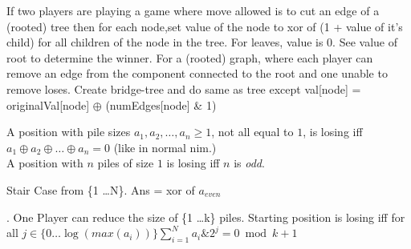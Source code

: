 If two players are playing a game where move allowed is to cut an edge of a (rooted) tree then for each node,set value of the node to xor of (1 + value of it's child) for all children of the node in the tree. For leaves, value is 0. See value of root to determine the winner. For a (rooted) graph, where each player can remove an edge from the component connected to the root and one unable to remove loses. Create bridge-tree and do same as tree except val[node] = originalVal[node] $\oplus$ (numEdges[node] \& 1)

 A position with pile sizes $a_1, a_2, \dots, a_n \ge 1$, not all equal to $1$, is losing iff $a_1 \oplus a_2 \oplus \dots \oplus a_n = 0$ (like in normal nim.)\\
A position with $n$ piles of size $1$ is losing iff $n$ is \emph{odd}.

 Stair Case from \{1 \ldots N\}. Ans = xor of $a_{even}$ 

. One Player can reduce the size of \{1 \ldots k\} piles. Starting position is losing iff for all $j \in \{0 \ldots \log(max(a_i))\} \sum_{i=1}^{N} a_{i}\&2^{j} = 0 \bmod k + 1$